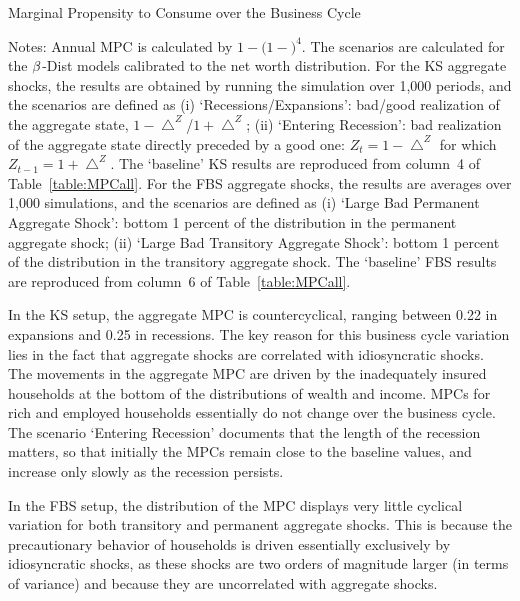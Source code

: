 \documentclass[12pt,titlepage]{econtex}
\renewcommand{\ptyLev}{\ensuremath{Z}} %
\newcommand{\tablenotessize}[1]{\footnotesize{#1}} %
\begin{document}
\begin{table}
  \caption{Marginal Propensity to Consume over the Business Cycle}
  \label{table:MPCscenarios}
  \begin{minipage}{\textwidth}
    
    \tablenotessize{Notes: Annual MPC is calculated by $1-(1-$\text{quarterly MPC}$)^{4}$. The scenarios
      are calculated for the $\beta$-Dist models calibrated to the net worth distribution. For the KS aggregate shocks, the results are obtained by running the simulation over 1,000 periods, and the scenarios are defined as (i) `Recessions/Expansions': bad/good realization of the aggregate state, $1-\bigtriangleup ^{\ptyLev}$/$1+\bigtriangleup ^{\ptyLev}$; (ii) `Entering Recession': bad realization of the aggregate state directly preceded by a good one: $\ptyLev_{t}=1-\bigtriangleup ^{\ptyLev}$ for which $\ptyLev_{t-1}=1+\bigtriangleup ^{\ptyLev}$. The `baseline' KS results are reproduced from column~4 of Table~\ref{table:MPCall}. For the FBS aggregate shocks, the results are averages over 1,000 simulations, and the scenarios are defined as (i) `Large Bad Permanent Aggregate Shock': bottom 1 percent of the distribution in the permanent aggregate shock; (ii) `Large Bad Transitory Aggregate Shock': bottom 1 percent of the distribution in the transitory aggregate shock. The `baseline' FBS results are reproduced from column~6 of Table~\ref{table:MPCall}.}
  \end{minipage}
\end{table}

In the KS setup, the aggregate MPC is countercyclical, ranging between 0.22 in expansions and 0.25 in recessions. The key reason for this business cycle variation lies in the fact that aggregate shocks are correlated with idiosyncratic shocks. The movements in the aggregate MPC are driven by the inadequately insured households at the bottom of the distributions of wealth and income. MPCs for rich and employed households essentially do not change over the business cycle. The scenario `Entering Recession' documents that the length of the recession matters, so that initially the MPCs remain close to the baseline values, and increase only slowly as the recession persists.

In the FBS setup, the distribution of the MPC displays very little cyclical variation for both transitory and permanent aggregate shocks. This is because the precautionary behavior of households is driven essentially exclusively by idiosyncratic shocks, as these shocks are two orders of magnitude larger (in terms of variance) and because they are uncorrelated with aggregate shocks.
\end{document}
